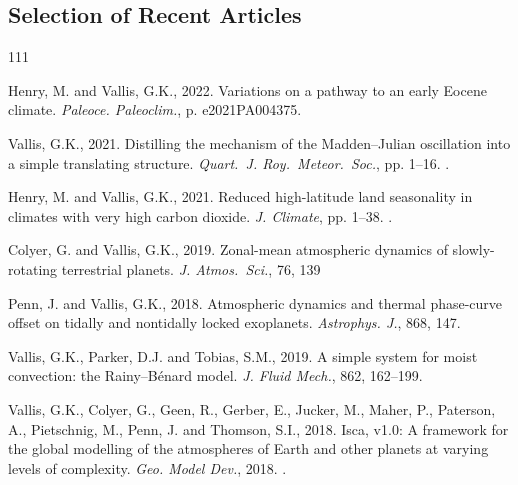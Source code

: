 \documentclass[11pt]{article}
\begin{document}
\subsection*{Selection of Recent Articles}
\setlength{\bibsep}{5pt}
\vspace{-0.5cm}
    \begin{thebibliography}{111}  
 
 Henry, M. and Vallis, G.K., 2022.
 \newblock Variations on a pathway to an early Eocene climate.
 \newblock \emph{Paleoce. Paleoclim.}, p. e2021PA004375.
 \newblock {}
 
 Vallis, G.K., 2021.
 \newblock Distilling the mechanism of the {Madden--Julian} oscillation into a
   simple translating structure.
 \newblock \emph{Quart.\ J. Roy.\ Meteor.\ Soc.}, pp. 1--16.
 \newblock {}.
 
 Henry, M. and Vallis, G.K., 2021.
 \newblock Reduced high-latitude land seasonality in climates with very high
   carbon dioxide.
 \newblock \emph{J. Climate}, pp. 1--38.
 \newblock {}.
        
Colyer, G. and Vallis, G.K., 2019.
\newblock Zonal-mean atmospheric dynamics of slowly-rotating terrestrial
  planets.
\newblock \emph{J. Atmos.\ Sci.}, 76, 139
        
        Penn, J. and Vallis, G.K., 2018.
        \newblock Atmospheric dynamics and thermal phase-curve offset on tidally and
          nontidally locked exoplanets.
        \newblock \emph{Astrophys. J.}, 868, 147.
        
        Vallis, G.K., Parker, D.J. and Tobias, S.M., 2019.
        \newblock A simple system for moist convection: the {Rainy--B\'enard} model.
        \newblock \emph{J. Fluid Mech.}, 862, 162--199.
        
        Vallis, G.K., Colyer, G., Geen, R., Gerber, E., Jucker, M., Maher, P.,
          Paterson, A., Pietschnig, M., Penn, J. and Thomson, S.I., 2018.
        \newblock Isca, v1.0: {A} framework for the global modelling of the atmospheres
          of {Earth} and other planets at varying levels of complexity.
        \newblock \emph{Geo. Model Dev.}, 2018.
        \newblock {}.
		

\end{thebibliography}
\end{document}
